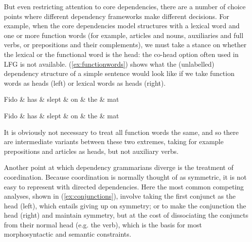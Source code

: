 \documentclass[output=paper,hidelinks]{langscibook}
\begin{document}
But even restricting attention to core dependencies, there are a
number of choice points where different dependency frameworks make
different decisions. For example, when the core dependencies model structures with a lexical word and one or more function words (for example, articles and
nouns, auxiliaries and full verbs, or prepositions and their
complements), we must take a stance on
whether the lexical or the functional word is the head: the co-head
option often used in LFG is not available. (\ref{ex:functionwords}) shows what the
(unlabelled) dependency structure of a simple sentence would look
like if we take function words as heads (left) or lexical
words as heads (right).
\begin{exe}
  \ex\label{ex:functionwords}
  \begin{dependency}[baseline=-0.6ex,theme=simple]
    \begin{deptext}
      Fido \& has \& slept \& on \& the \& mat \\
    \end{deptext}
  \end{dependency}
  \begin{dependency}[baseline=-0.6ex,theme=simple]
    \begin{deptext}
      Fido \& has \& slept \& on \& the \& mat \\
    \end{deptext}
  \end{dependency}
\end{exe}
It is obviously not necessary to treat all function words the same,
and so there are intermediate variants between these two extremes,
taking for example prepositions and articles as heads, but not auxiliary verbs.

Another point at which dependency grammarians diverge is the treatment
of coordination. Because coordination is normally thought of as
symmetric, it is not easy to represent with directed
dependencies. Here the most common competing analyses, shown in
(\ref{ex:conjunctions}), involve taking the first conjunct as the head (left),
which entails giving up on symmetry; or to make the conjunction the
head (right) and maintain symmetry, but at the cost of dissociating the
conjuncts from their normal head (e.g. the verb), which is the basis
for most morphosyntactic and semantic constraints.
\end{document}
